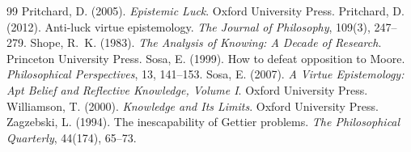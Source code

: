 \documentclass{situationist-preprint}
\begin{document}
\begin{thebibliography}{99}
 Pritchard, D. (2005). \emph{Epistemic Luck}. Oxford University Press.
 Pritchard, D. (2012). Anti-luck virtue epistemology. \emph{The Journal of Philosophy}, 109(3), 247--279.
 Shope, R.~K. (1983). \emph{The Analysis of Knowing: A Decade of Research}. Princeton University Press.
 Sosa, E. (1999). How to defeat opposition to Moore. \emph{Philosophical Perspectives}, 13, 141--153.
 Sosa, E. (2007). \emph{A Virtue Epistemology: Apt Belief and Reflective Knowledge, Volume I}. Oxford University Press.
 Williamson, T. (2000). \emph{Knowledge and Its Limits}. Oxford University Press.
 Zagzebski, L. (1994). The inescapability of Gettier problems. \emph{The Philosophical Quarterly}, 44(174), 65--73.
\end{thebibliography}
\end{document}

